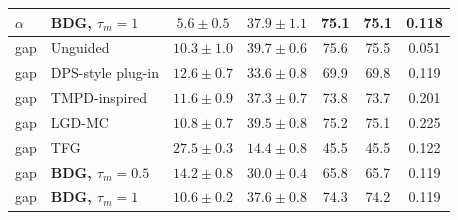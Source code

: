 \documentclass{article}
\begin{document}
\begin{table}[!htbp]
\begin{tabular}{llccccc}
$\alpha$ & \textbf{BDG, $\tau_m=1$} & $5.6\pm0.5$ & $37.9\pm1.1$ & 75.1 & 75.1 & 0.118\\
\midrule
gap & Unguided & $10.3\pm1.0$ & $39.7\pm0.6$ & 75.6 & 75.5 & 0.051\\
gap & DPS-style plug-in & $12.6\pm0.7$ & $33.6\pm0.8$ & 69.9 & 69.8 & 0.119\\
gap & TMPD-inspired & $11.6\pm0.9$ & $37.3\pm0.7$ & 73.8 & 73.7 & 0.201\\
gap & LGD-MC & $10.8\pm0.7$ & $39.5\pm0.8$ & 75.2 & 75.1 & 0.225\\
gap & TFG & $27.5\pm0.3$ & $14.4\pm0.8$ & 45.5 & 45.5 & 0.122\\
gap & \textbf{BDG, $\tau_m=0.5$} & $14.2\pm0.8$ & $30.0\pm0.4$ & 65.8 & 65.7 & 0.119\\
gap & \textbf{BDG, $\tau_m=1$} & $10.6\pm0.2$ & $37.6\pm0.8$ & 74.3 & 74.2 & 0.119\\
\bottomrule
\end{tabular}
\end{table}
\clearpage
\end{document}
